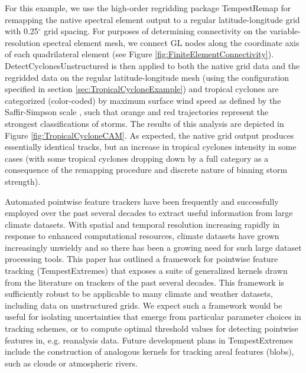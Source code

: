 \documentclass[gmdd, hvmath, online]{copernicus_discussions}
\begin{document}
For this example, we use the high-order regridding package TempestRemap \citep{ullrich2015arbitrary, ullrich2016arbitrary} for remapping the native spectral element output to a regular latitude-longitude grid with 0.25$^\circ$ grid spacing.  For purposes of determining connectivity on the variable-resolution spectral element mesh, we connect GL nodes along the coordinate axis of each quadrilateral element (see Figure \ref{fig:FiniteElementConnectivity}).  DetectCyclonesUnstructured is then applied to both the native grid data and the regridded data on the regular latitude-longitude mesh (using the configuration specified in section \ref{sec:TropicalCycloneExample}) and tropical cyclones are categorized (color-coded) by maximum surface wind speed as defined by the Saffir-Simpson scale \citep{Simpson1974}, such that orange and red trajectories represent the strongest classifications of storms.  The results of this analysis are depicted in Figure \ref{fig:TropicalCycloneCAM}.  As expected, the native grid output produces essentially identical tracks, but an increase in tropical cyclones intensity in some cases (with some tropical cyclones dropping down by a full category as a consequence of the remapping procedure and discrete nature of binning storm strength).

\conclusions \label{sec:Conclusions}

Automated pointwise feature trackers have been frequently and successfully employed over the past several decades to extract useful information from large climate datasets.  With spatial and temporal resolution increasing rapidly in response to enhanced computational resources, climate datasets have grown increasingly unwieldy and so there has been a growing need for such large dataset processing tools.  This paper has outlined a framework for pointwise feature tracking (TempestExtremes) that exposes a suite of generalized kernels drawn from the literature on trackers of the past several decades.  This framework is sufficiently robust to be applicable to many climate and weather datasets, including data on unstructured grids.  We expect such a framework would be useful for isolating uncertainties that emerge from particular parameter choices in tracking schemes, or to compute optimal threshold values for detecting pointwise features in, e.g. reanalysis data.  Future development plans in TempestExtremes include the construction of analogous kernels for tracking areal features (blobs), such as clouds or atmospheric rivers.

\end{document}
